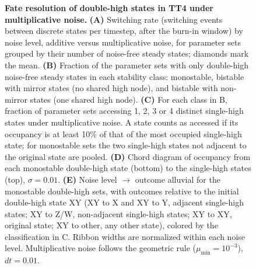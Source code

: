 \documentclass[11pt]{article}
\providecommand{\DIFaddtex}[1]{{\protect\color{red}#1}} %
\providecommand{\DIFdeltex}[1]{} %
\providecommand{\DIFaddFL}[1]{\DIFadd{#1}} %
\providecommand{\DIFdelFL}[1]{\DIFdel{#1}} %
\providecommand{\DIFaddbeginFL}{} %
\providecommand{\DIFaddendFL}{} %
\providecommand{\DIFdelendFL}{} %
\providecommand{\DIFadd}[1]{\texorpdfstring{\DIFaddtex{#1}}{#1}} %
\providecommand{\DIFdel}[1]{\texorpdfstring{\DIFdeltex{#1}}{}} %
\providecommand{\DIFaddincludegraphics}[2][]{\DIFOincludegraphics[#1]{#2}} %
\DeclareRobustCommand{\DIFaddbeginFL}{\DIFOaddbeginFL \let\includegraphics\DIFaddincludegraphics} %
\DeclareRobustCommand{\DIFaddendFL}{\DIFOaddendFL \let\includegraphics\DIFOincludegraphics} %
\DeclareRobustCommand{\DIFdelendFL}{\DIFOaddendFL \let\includegraphics\DIFOincludegraphics} %
\begin{document}
\begin{figure}
{{    }\textbf{\DIFdelFL{(D)}} %
\DIFdelFL{Circular chord diagram of double-high $\to$ single-high MRT flow among monostable double-high parameter sets, at noise = 0.01.
    }\textbf{\DIFdelFL{(E)}} %
\DIFdelFL{Noise-level $\to$ outcome alluvial for the pooled monostable double-high population (outcomes labeled relative to the initial double-high state XY, e.g.\ ``XY to X''), colored by the multistability classification from panel C.
}}
\DIFdelendFL \DIFaddbeginFL \caption{\textbf{\DIFaddFL{Fate resolution of double-high states in TT4 under multiplicative noise.}}
    \textbf{\DIFaddFL{(A)}} \DIFaddFL{Switching rate (switching events between discrete states per timestep, after the burn-in window) by noise level, additive versus multiplicative noise, for parameter sets grouped by their number of noise-free steady states; diamonds mark the mean.
    }\textbf{\DIFaddFL{(B)}} \DIFaddFL{Fraction of the parameter sets with only double-high noise-free steady states in each stability class: monostable, bistable with mirror states (no shared high node), and bistable with non-mirror states (one shared high node).
    }\textbf{\DIFaddFL{(C)}} \DIFaddFL{For each class in B, fraction of parameter sets accessing 1, 2, 3 or 4 distinct single-high states under multiplicative noise. A state counts as accessed if its occupancy is at least 10\% of that of the most occupied single-high state; for monostable sets the two single-high states not adjacent to the original state are pooled.
    }\textbf{\DIFaddFL{(D)}} \DIFaddFL{Chord diagram of occupancy from each monostable double-high state (bottom) to the single-high states (top), $\sigma = 0.01$.
    }\textbf{\DIFaddFL{(E)}} \DIFaddFL{Noise level $\to$ outcome alluvial for the monostable double-high sets, with outcomes relative to the initial double-high state XY (XY to X and XY to Y, adjacent single-high states; XY to Z/W, non-adjacent single-high states; XY to XY, original state; XY to other, any other state), colored by the classification in C. Ribbon widths are normalized within each noise level.
    Multiplicative noise follows the geometric rule ($\mu_{\min} = 10^{-3}$), $dt = 0.01$.
}}
    \DIFaddendFL \label{fig:6}
\end{figure}
\end{document}
